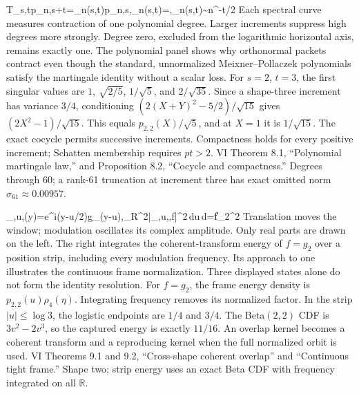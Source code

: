 {T_{s,t}p_{n,s+t}=\sigma_n(s,t)p_{n,s},\qquad \sigma_n(s,t)=,\quad \sigma_n(s,t)\sim{}n^{-t/2}}
{Each spectral curve measures contraction of one polynomial degree. Larger increments suppress high degrees more strongly. Degree zero, excluded from the logarithmic horizontal axis, remains exactly one. The polynomial panel shows why orthonormal packets contract even though the standard, unnormalized Meixner--Pollaczek polynomials satisfy the martingale identity without a scalar loss.}
{For $s=2$, $t=3$, the first singular values are $1$, $\sqrt{2/5}$, $1/\sqrt5$, and $2/\sqrt{35}$. Since a shape-three increment has variance $3/4$, conditioning $(2(X+Y)^2-5/2)/\sqrt{15}$ gives $(2X^2-1)/\sqrt{15}$. This equals $p_{2,2}(X)/\sqrt5$, and at $X=1$ it is $1/\sqrt{15}$.}
{The exact cocycle permits successive increments. Compactness holds for every positive increment; Schatten membership requires $pt>2$.}
{VI Theorem 8.1, ``Polynomial martingale law,'' and Proposition 8.2, ``Cocycle and compactness.'' Degrees through 60; a rank-61 truncation at increment three has exact omitted norm $\sigma_{61}\approx0.00957$.}

{\psi_{\alpha,u,\eta}(y)=e^{i\eta(y-u/2)}g_\alpha(y-u),\qquad {}\int_{\mathbb R^2}|\langle\psi_{\alpha,u,\eta},f\rangle|^2\,du\,d\eta=\|f\|_2^2}
{Translation moves the window; modulation oscillates its complex amplitude. Only real parts are drawn on the left. The right integrates the coherent-transform energy of $f=g_2$ over a position strip, including every modulation frequency. Its approach to one illustrates the continuous frame normalization. Three displayed states alone do not form the identity resolution.}
{For $f=g_2$, the frame energy density is $p_{2,2}(u)\rho_4(\eta)$. Integrating frequency removes its normalized factor. In the strip $|u|\le\log3$, the logistic endpoints are $1/4$ and $3/4$. The Beta$(2,2)$ CDF is $3v^2-2v^3$, so the captured energy is exactly $11/16$.}
{An overlap kernel becomes a coherent transform and a reproducing kernel when the full normalized orbit is used.}
{VI Theorems 9.1 and 9.2, ``Cross-shape coherent overlap'' and ``Continuous tight frame.'' Shape two; strip energy uses an exact Beta CDF with frequency integrated on all $\mathbb R$.}

